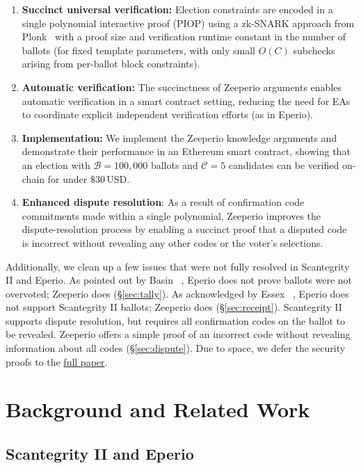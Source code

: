 \begin{enumerate}
 	\item \textbf{Succinct universal verification:} Election constraints are encoded in a single polynomial interactive proof (PIOP) using a zk-SNARK approach from Plonk~\cite{GWC19} with a proof size and verification runtime constant in the number of ballots (for fixed template parameters, with only small $O(C)$ subchecks arising from per-ballot block constraints).
 	\item \textbf{Automatic verification:} The succinctness of Zeeperio arguments enables automatic verification in a smart contract setting, reducing the need for EAs to coordinate explicit independent verification efforts (as in Eperio).
 	\item \textbf{Implementation:} We implement the Zeeperio knowledge arguments and demonstrate their performance in an Ethereum smart contract, showing that an election with $\mathcal{B}=100{,}000$ ballots and $\mathcal{C}=5$ candidates can be verified on-chain for under $\$30\,$USD.
 	\item \textbf{Enhanced dispute resolution}: As a result of confirmation code commitments made within a single polynomial, Zeeperio improves the dispute-resolution process by enabling a succinct proof that a disputed code is incorrect without revealing any other codes or the voter’s selections.
 \end{enumerate}

\noindent Additionally, we clean up a few issues that were not fully resolved in Scantegrity II and Eperio. As pointed out by Basin \etal~\cite{BDGR21}, Eperio does not prove ballots were not overvoted; Zeeperio does (\S\ref{sec:tally}). As acknowledged by Essex \etal~\cite{ECHA10}, Eperio does not support Scantegrity II ballots; Zeeperio does (\S\ref{sec:receipt}). Scantegrity II~\cite{CCC+08} supports dispute resolution, but requires all confirmation codes on the ballot to be revealed. Zeeperio offers a simple proof of an incorrect code without revealing information about all codes (\S\ref{sec:dispute}). Due to space, we defer the security proofs to the \href{https://eprint.iacr.org/2026/565.pdf}{full paper}.


\section{Background and Related Work}

\subsection{Scantegrity II and Eperio}

